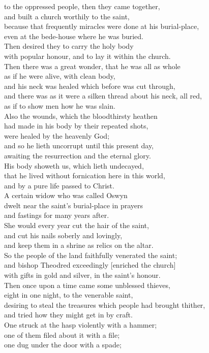 \documentclass[10pt]{book}
\begin{document}
\begin{center}
\parbox{\pagelen}{
to the oppressed people, then they came together, \\
and built a church worthily to the saint, \\
because that frequently miracles were done at his burial-place, \\
even at the bede-house where he was buried. \\
Then desired they to carry the holy body \\
with popular honour, and to lay it within the church. \\
Then there was a great wonder, that he was all as whole \\
as if he were alive, with clean body, \\
and his neck was healed which before was cut through, \\
and there was as it were a silken thread about his neck, all red, \\
as if to show men how he was slain. \\
Also the wounds, which the bloodthirsty heathen \\
had made in his body by their repeated shots, \\
were healed by the heavenly God; \\
and so he lieth uncorrupt until this present day, \\
awaiting the resurrection and the eternal glory. \\
His body showeth us, which lieth undecayed, \\
that he lived without fornication here in this world, \\
and by a pure life passed to Christ. \\
A certain widow who was called Oswyn \\
dwelt near the saint's burial-place in prayers \\
and fastings for many years after. \\
She would every year cut the hair of the saint, \\
and cut his nails soberly and lovingly, \\
and keep them in a shrine as relics on the altar. \\
So the people of the land faithfully venerated the saint; \\
and bishop Theodred exceedingly [enriched the church] \\
with gifts in gold and silver, in the saint's honour. \\
Then once upon a time came some unblessed thieves, \\
eight in one night, to the venerable saint, \\
desiring to steal the treasures which people had brought thither, \\
and tried how they might get in by craft. \\
One struck at the hasp violently with a hammer; \\
one of them filed about it with a file; \\
one dug under the door with a spade; \\
}
\end{center}
\end{document}
